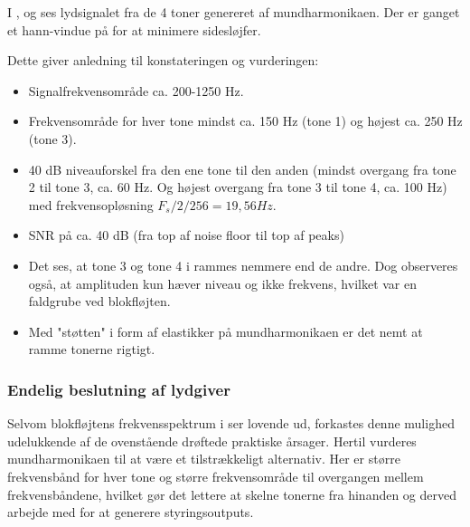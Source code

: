 {



I ,  og  ses lydsignalet fra de 4 toner genereret af mundharmonikaen. Der er ganget et hann-vindue på for at minimere sidesløjfer.



Dette giver anledning til konstateringen og vurderingen:
\begin{itemize}
    \item Signalfrekvensområde ca. 200-1250 Hz.
    \item Frekvensområde for hver tone mindst ca. 150 Hz (tone 1) og højest ca. 250 Hz (tone 3).
    \item 40 dB niveauforskel fra den ene tone til den anden (mindst overgang fra tone 2 til tone 3, ca. 60 Hz. Og højest overgang fra tone 3 til tone 4, ca. 100 Hz) med frekvensopløsning $F_s/2/256 = 19,56 Hz$.
    \item SNR på ca. 40 dB (fra top af noise floor til top af peaks)
    \item Det ses, at tone 3 og tone 4 i  rammes nemmere end de andre. Dog observeres også, at amplituden kun hæver niveau og ikke frekvens, hvilket var en faldgrube ved blokfløjten. 
    \item Med "støtten" i form af elastikker på mundharmonikaen er det nemt at ramme tonerne rigtigt.
\end{itemize}

\subsubsection{Endelig beslutning af lydgiver}
Selvom blokfløjtens frekvensspektrum i  ser lovende ud, forkastes denne mulighed udelukkende af de ovenstående drøftede praktiske årsager. Hertil vurderes mundharmonikaen til at være et tilstrækkeligt alternativ. Her er større frekvensbånd for hver tone og større frekvensområde til overgangen mellem frekvensbåndene, hvilket gør det lettere at skelne tonerne fra hinanden og derved arbejde med for at generere styringsoutputs. 

}
